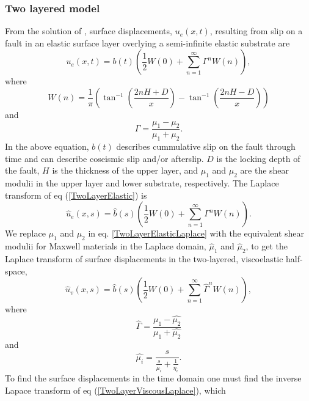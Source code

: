 \documentclass[extra]{gji}
\begin{document}
\subsubsection{Two layered model}
From the solution of \citet{R1971}, surface displacements,
$u_{e}(x,t)$, resulting from slip on a fault in an elastic surface
layer overlying a semi-infinite elastic substrate are
\begin{equation}\label{TwoLayerElastic}
  u_{e}(x,t) = b(t)\left(\frac{1}{2} W(0) + 
    \sum_{n=1}^\infty \Gamma^nW(n)\right),
\end{equation}
where
\begin{equation}
  W(n) = \frac{1}{\pi}\left(\tan^{-1}\left(\frac{2nH + D}{x}\right) 
    - \tan^{-1}\left(\frac{2nH - D}{x}\right)\right)
\end{equation}
and
\begin{equation}
  \Gamma = \frac{\mu_1 - \mu_2}{\mu_1 + \mu_2}.
\end{equation}
In the above equation, $b(t)$ describes cummulative slip on the fault
through time and can describe coseismic slip and/or afterslip. $D$ is
the locking depth of the fault, $H$ is the thickness of the upper
layer, and $\mu_1$ and $\mu_2$ are the shear modulii in the upper
layer and lower substrate, respectively.  The Laplace transform of eq
(\ref{TwoLayerElastic}) is
\begin{equation}\label{TwoLayerElasticLaplace}
 \hat{u}_e(x,s) = \hat{b}(s)\left(\frac{1}{2} W(0) +\sum_{n=1}^\infty\Gamma^nW(n)\right).
\end{equation}
We replace $\mu_1$ and $\mu_2$ in eq. \ref{TwoLayerElasticLaplace}
with the equivalent shear modulii for Maxwell materials in the Laplace
domain, $\hat{\mu}_1$ and $\hat{\mu}_2$, to get the Laplace
transform of surface displacements in the two-layered, viscoelastic
half-space,
\begin{equation}\label{TwoLayerViscousLaplace}
 \hat{u}_v(x,s) = \hat{b}(s)\left(\frac{1}{2}W(0) +\sum_{n=1}^\infty\hat{\Gamma}^nW(n)\right),
\end{equation}
where
\begin{equation}
  \hat{\Gamma} = \frac{\hat{\mu_1} - \hat{\mu_2}}{\hat{\mu_1} + \hat{\mu_2}}
\end{equation}
and
\begin{equation}
  \hat{\mu_i} = \frac{s}{\frac{s}{\mu_i} + \frac{1}{\eta_i}}.
\end{equation}
To find the surface displacements in the time domain one must find the
inverse Lapace transform of eq (\ref{TwoLayerViscousLaplace}), which
\end{document}

